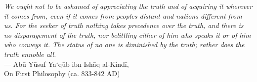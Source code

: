 \thispagestyle{empty}
{}

\vspace*{3cm}

\begin{center}
    \emph{We ought not to be ashamed of appreciating the truth and of acquiring it wherever it comes from, even if it comes from peoples distant and nations different from us. For the seeker of truth nothing takes precedence over the truth, and there is no disparagement of the truth, nor belittling either of him who speaks it or of him who conveys it. The status of no one is diminished by the truth; rather does the truth ennoble all.} \\ \medskip
    --- Abū Yūsuf Ya‘qūb ibn Ishāq al-Kindī,\\ On First Philosophy (ca. 833-842 AD)    
\end{center}


